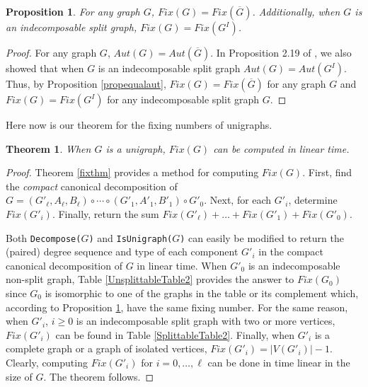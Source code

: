 \documentclass[11pt]{article}
\newtheorem{theorem}[df]{Theorem}
\newtheorem{proposition}[df]{Proposition}
\begin{document}
\smallskip



\begin{proposition}
For any graph $G$, $Fix(G) = Fix(\overline{G})$.  Additionally, when $G$ is an indecomposable split graph, $Fix(G) = Fix(G^I)$.
\label{equaldistnums}
\end{proposition}

\begin{proof}
For any graph $G$, $Aut(G) = Aut(\overline{G})$.  In Proposition 2.19 of \cite{Ch25}, we also showed that when $G$ is an indecomposable split graph $Aut(G) = Aut(G^I)$.  Thus,  by Proposition \ref{propequalaut},  $Fix(G) = Fix(\overline{G})$ for any graph $G$ and $Fix(G) = Fix(G^I)$ for any indecomposable split graph $G$. 
\end{proof}

Here now is our theorem for the fixing numbers of unigraphs. 


\begin{theorem}
When $G$ is a unigraph, $Fix(G)$ can be computed in linear time.  
\end{theorem}

\begin{proof}
Theorem \ref{fixthm} provides a method for computing $Fix(G)$.  First, find the {\it compact} canonical decomposition of $G = (G'_\ell, A_\ell, B_\ell)  \circ \cdots \circ (G'_1, A'_1, B'_1) \circ G'_0$.  Next, for each $G'_i$, determine $Fix(G'_i)$.  Finally, return the sum $Fix(G'_\ell) + \hdots + Fix(G'_1) + Fix(G'_0)$.   

 Both {\tt Decompose($G$)} and {\tt IsUnigraph($G$)} can easily be modified to return the (paired) degree sequence and type of each component $G'_i$ in the compact canonical decomposition of $G$ in linear time.  When $G'_0$ is an indecomposable non-split graph, Table \ref{UnsplittableTable2} provides the answer to $Fix(G_0)$ since $G_0$ is isomorphic to one of the graphs in the table or its complement which,  according to Proposition \ref{equaldistnums}, have the same fixing number.  For the same reason, when  $G'_i$, $i \ge 0$ is an indecomposable split graph with two or more vertices, $Fix(G'_i)$ can be found in Table \ref{SplittableTable2}.   Finally, when $G'_i$ is a complete graph or a graph of isolated vertices, $Fix(G'_i) = |V(G'_i)| - 1$.   Clearly, computing $Fix(G'_i)$ for $i = 0, \hdots, \ell$ can be done in time linear in the size of $G$.  The theorem follows.
\end{proof} 
\end{document}
